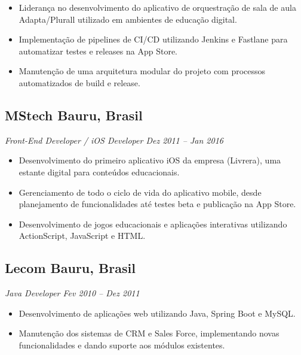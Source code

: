 \documentclass[a4paper,10pt]{article}
\begin{document}
\begin{itemize}

\item Liderança no desenvolvimento do aplicativo de orquestração de sala de aula Adapta/Plurall utilizado em ambientes de educação digital.

\item Implementação de pipelines de CI/CD utilizando Jenkins e Fastlane para automatizar testes e releases na App Store.

\item Manutenção de uma arquitetura modular do projeto com processos automatizados de build e release.

\end{itemize}

\subsection*{\textbf{MStech} \hfill Bauru, Brasil}
\textit{Front-End Developer / iOS Developer \hfill Dez 2011 – Jan 2016}

\begin{itemize}

\item Desenvolvimento do primeiro aplicativo iOS da empresa (Livrera), uma estante digital para conteúdos educacionais.

\item Gerenciamento de todo o ciclo de vida do aplicativo mobile, desde planejamento de funcionalidades até testes beta e publicação na App Store.

\item Desenvolvimento de jogos educacionais e aplicações interativas utilizando ActionScript, JavaScript e HTML.

\end{itemize}

\subsection*{\textbf{Lecom} \hfill Bauru, Brasil}
\textit{Java Developer \hfill Fev 2010 – Dez 2011}

\begin{itemize}

\item Desenvolvimento de aplicações web utilizando Java, Spring Boot e MySQL.

\item Manutenção dos sistemas de CRM e Sales Force, implementando novas funcionalidades e dando suporte aos módulos existentes.

\end{itemize}
\end{document}

